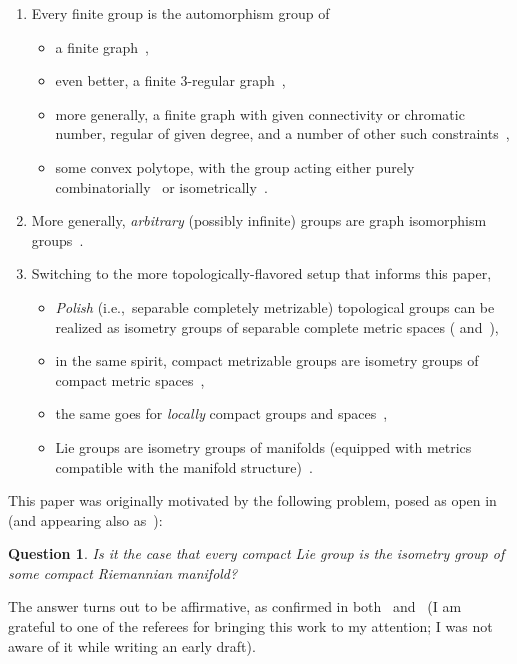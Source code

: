 \documentclass[10pt,a4paper]{amsart}
\numberwithin{equation}{section}
\newtheorem{Question}[Theorem]{Question}
\begin{document}
\begin{enumerate}[(1)]\itemsep=0pt
\item Every finite group is the automorphism group of
 \begin{itemize}\itemsep=0pt
 \item a finite graph~\cite{frcht},
 \item even better, a finite 3-regular graph~\cite[Theorems 2.4 and 4.1]{frcht-3},
 \item more generally, a finite graph with given connectivity or chromatic number, regular of given degree, and a number of other such constraints~\cite[Theorem~1.2]{sabid},
 \item some convex polytope, with the group acting either purely combinatorially~\cite[Theorems 1 and 2]{Schulte:2015eu} or isometrically~\cite[Theorem~1.1]{Doignon:2018ch}.
 \end{itemize}
\item More generally, {\it arbitrary} (possibly infinite) groups are graph isomorphism groups~\cite[Theo\-rem]{sabid-inf}.
\item Switching to the more topologically-flavored setup that informs this paper,
 \begin{itemize}\itemsep=0pt
 \item {\it Polish} (i.e.,~separable completely metrizable) topological groups can be realized as isometry groups of separable complete metric spaces (\cite{gk} and~\cite[Section~3]{mell}),
 \item in the same spirit, compact metrizable groups are isometry groups of compact metric spaces~\cite[Theorem~1.2]{mell},
 \item the same goes for {\it locally} compact groups and spaces~\cite[Theorem~2.1]{ml},
 \item Lie groups are isometry groups of manifolds (equipped with metrics compatible with the manifold structure)~\cite[Corollary~1.2 and discussion following Proposition~1.4]{niem}.
 \end{itemize}
\end{enumerate}
This paper was originally motivated by the following problem, posed as open in~\cite[Section~4]{mell} (and appearing also as~\cite[Question~Q4]{niem}):

\begin{Question}\label{qu:mot}
 Is it the case that every compact Lie group is the isometry group of some compact Riemannian manifold?
\end{Question}

The answer turns out to be affirmative, as confirmed in both~\cite[Theo\-rem~3]{bd} and~\cite[Theo\-rem~1]{sz} (I am grateful to one of the referees for bringing this work to my attention; I was not aware of it while writing an early draft).
\end{document}
